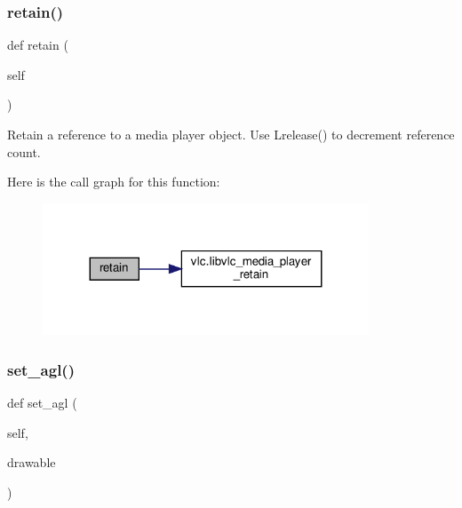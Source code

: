 \subsubsection{\texorpdfstring{retain()}{retain()}}
{\footnotesize\ttfamily def retain (\begin{DoxyParamCaption}\item[{}]{self }\end{DoxyParamCaption})}

\begin{DoxyVerb}Retain a reference to a media player object. Use
L{release}() to decrement reference count.
\end{DoxyVerb}
 Here is the call graph for this function\+:
\nopagebreak
\begin{figure}[H]
\begin{center}
\leavevmode
\includegraphics[width=275pt]{classvlc_1_1_media_player_a6394d82a0b79f0f91bb059d20ab43490_cgraph}
\end{center}
\end{figure}
\mbox{\label{classvlc_1_1_media_player_ac4c4fcc49773eef53d5666f1c1365d71}} 
\subsubsection{\texorpdfstring{set\+\_\+agl()}{set\_agl()}}
{\footnotesize\ttfamily def set\+\_\+agl (\begin{DoxyParamCaption}\item[{}]{self,  }\item[{}]{drawable }\end{DoxyParamCaption})}

